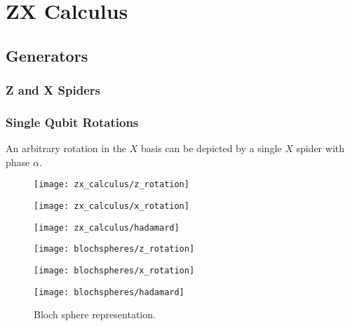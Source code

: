 \chapter{ZX Calculus}

\section{Generators}

\subsection{Z and X Spiders}

\subsection{Single Qubit Rotations}
An arbitrary rotation in the $X$ basis can be depicted by a single $X$ spider with phase $\alpha$.

\begin{figure}[H]
\centering
    \begin{minipage}{.3\textwidth}
      \centering
      \texttt{[image: zx\_calculus/z\_rotation]}
    \end{minipage}%
    \begin{minipage}{.3\textwidth}
      \centering
      \texttt{[image: zx\_calculus/x\_rotation]}
    \end{minipage}%
    \begin{minipage}{.3\textwidth}
      \centering
      \texttt{[image: zx\_calculus/hadamard]}
    \end{minipage}
    \begin{minipage}{.3\textwidth}
      \centering
      \texttt{[image: blochspheres/z\_rotation]}
    \end{minipage}
    \begin{minipage}{.3\textwidth}
      \centering
      \texttt{[image: blochspheres/x\_rotation]}
    \end{minipage}
    \begin{minipage}{.3\textwidth}
      \centering
      \texttt{[image: blochspheres/hadamard]}
    \end{minipage}
    \caption{Bloch sphere representation.}
\end{figure}

